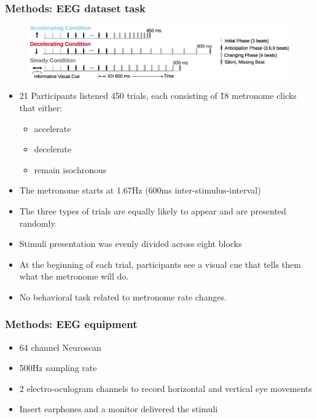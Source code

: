 \documentclass{beamer}
\begin{document}
\begin{frame}
	\frametitle{Methods: EEG dataset task}
	
	\begin{figure}
		\centering
		\includegraphics[scale=0.85]{fig11.jpg}
	\end{figure}
	
	\begin{itemize}

		\item 21 Participants listened 450 trials, each consisting of \~18 metronome clicks that either:
		\begin{itemize} 
			\item accelerate
			\item decelerate
			\item remain isochronous
		\end{itemize}

		\item The metronome starts at 1.67Hz (600ms inter-stimulus-interval)

		\item The three types of trials are equally likely to appear and are presented randomly.

		\item Stimuli presentation was evenly divided across eight blocks

		\item At the beginning of each trial, participants see a visual cue that tells them what the metronome will do. 
		
		\item No behavioral task related to metronome rate changes.

	\end{itemize}

\end{frame}

\begin{frame}
	\frametitle{Methods: EEG equipment}
	
	\begin{itemize}

		\item 64 channel Neuroscan

		\item 500Hz sampling rate

		\item 2 electro-oculogram channels to record horizontal and vertical eye movements 
		
		\item Insert earphones and a monitor delivered the stimuli

	\end{itemize}

\end{frame}
\end{document}
